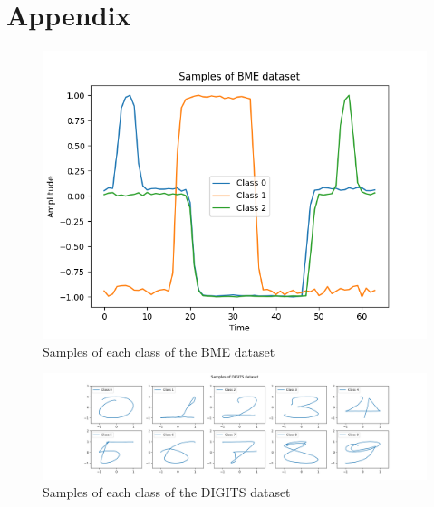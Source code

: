 \documentclass[11pt]{article}
\begin{document}
\newpage

{\small


}

\section{Appendix}

\paragraph{}

\begin{figure}[!ht]
    \centering
    \includegraphics[scale=0.6]{../../figures/BME_samples.png}
    \caption{Samples of each class of the BME dataset} \label{fig:BME_samples}
\end{figure}

\begin{figure}[!ht]
    \centering
    \includegraphics[scale=1.1]{../../figures/DIGITS_samples.png}
    \caption{Samples of each class of the DIGITS dataset} \label{fig:DIGITS_samples}
\end{figure}
\end{document}
